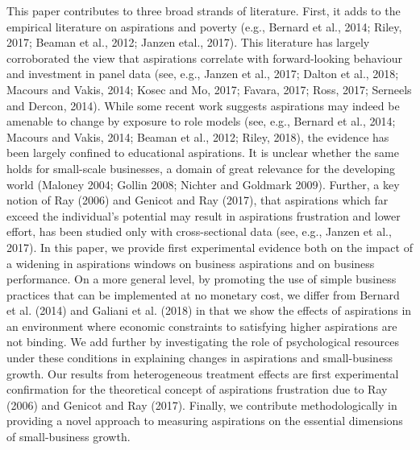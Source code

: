 \documentclass[11.5pt]{article}
\begin{document}
{This paper contributes to three broad strands of literature. First, it adds to the empirical literature on aspirations and poverty (e.g., Bernard et al., 2014; Riley, 2017; Beaman et al., 2012; Janzen etal., 2017). This literature has largely corroborated the view that aspirations correlate with forward-looking behaviour and investment in panel data (see, e.g., Janzen et al., 2017; Dalton et al., 2018; Macours and Vakis, 2014; Kosec and Mo, 2017; Favara, 2017; Ross, 2017; Serneels and Dercon, 2014). While some recent work suggests aspirations may indeed be amenable to change by exposure to role models (see, e.g., Bernard et al., 2014; Macours and Vakis, 2014; Beaman et al., 2012; Riley, 2018), the evidence has been largely confined to educational aspirations. It is unclear whether the same holds for small-scale businesses, a domain of great relevance for the developing world (Maloney 2004; Gollin 2008; Nichter and Goldmark 2009). Further, a key notion of Ray (2006) and Genicot and Ray (2017), that aspirations which far exceed the individual's potential may result in aspirations frustration and lower effort, has been studied only with cross-sectional data (see, e.g., Janzen et al., 2017). In this paper, we provide first experimental evidence both on the impact of a widening in aspirations windows on business aspirations and on business performance. On a more general level, by promoting the use of simple business practices that can be implemented at no monetary cost, we differ from Bernard et al. (2014) and Galiani et al. (2018) in that we show the effects of aspirations in an environment where economic constraints to satisfying higher aspirations are not binding. We add further by investigating the role of psychological resources under these conditions in explaining changes in aspirations and small-business growth. Our results from heterogeneous treatment effects are first experimental confirmation for the theoretical concept of aspirations frustration due to Ray (2006) and Genicot and Ray (2017). Finally, we contribute methodologically in providing a novel approach to measuring aspirations on the essential dimensions of small-business growth.

}
\end{document}
